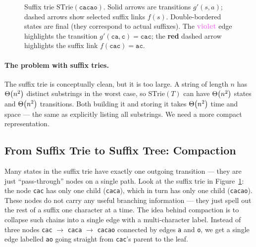 \begin{figure}[H]
\caption{%
  Suffix trie $\mathrm{STrie}(\texttt{cacao})$.
  Solid arrows are transitions $g'(s,a)$; dashed arrows show selected
  suffix links $f(s)$.
  Double-bordered states are final (they correspond to actual suffixes).
  The \textcolor{violet}{\textbf{violet}} edge highlights the transition
  $g'(\texttt{ca},\texttt{c}) = \texttt{cac}$;
  the \textcolor{red!70!black}{\textbf{red}} dashed arrow highlights
  the suffix link $f(\texttt{cac}) = \texttt{ac}$.
}
\label{fig:strie-cacao}
\end{figure}

\paragraph{The problem with suffix tries.}
The suffix trie is conceptually clean, but it is too large.
A string of length $n$ has $\Theta\!\left(n^2\right)$ distinct substrings in the worst
case, so $\mathrm{STrie}(T)$ can have $\Theta\!\left(n^2\right)$ states and $\Theta\!\left(n^2\right)$
transitions.
Both building it and storing it takes $\Theta\!\left(n^2\right)$ time and space --- the
same as explicitly listing all substrings.
We need a more compact representation.

\subsection{From Suffix Trie to Suffix Tree: Compaction}


Many states in the suffix trie have exactly one outgoing transition ---
they are just ``pass-through'' nodes on a single path.
Look at the suffix trie in Figure~\ref{fig:strie-cacao}: the node
\texttt{cac} has only one child (\texttt{caca}), which in turn has only
one child (\texttt{cacao}).
These nodes do not carry any useful branching information --- they just
spell out the rest of a suffix one character at a time.
The idea behind compaction is to collapse such chains into a single edge
with a multi-character label.
Instead of three nodes \texttt{cac} $\to$ \texttt{caca} $\to$
\texttt{cacao} connected by edges \texttt{a} and \texttt{o}, we get a
single edge labelled \texttt{ao} going straight from \texttt{cac}'s
parent to the leaf.

